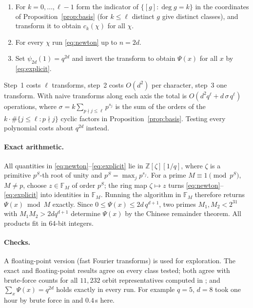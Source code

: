 \documentclass[11pt,a4paper]{article}
\theoremstyle{definition}
\theoremstyle{remark}
\begin{document}
\begin{enumerate}[label=\arabic*.,nosep]
\item For $k=0,\dots,\ell-1$ form the indicator of $\{[g]:\deg g=k\}$ in the coordinates of
      Proposition~\ref{prop:basis} (for $k\le\ell$ distinct $g$ give distinct classes), and transform
      it to obtain $c_k(\chi)$ for all $\chi$.
\item For every $\chi$ run \eqref{eq:newton} up to $n=2d$.
\item Set $\psi_{2d}(1)=q^{2d}$ and invert the transform to obtain $\Psi(x)$ for all $x$ by \eqref{eq:explicit}.
\end{enumerate}
Step~1 costs $\ell$ transforms, step~2 costs $O(d^2)$ per character, step~3 one transform. With
naive transforms along each axis the total is $O(d^2q^\ell+d\,\sigma\,q^\ell)$ operations, where
$\sigma=k\sum_{p\nmid j\le\ell}p^{s_j}$ is the sum of the orders of the $k\cdot\#\{j\le\ell:p\nmid j\}$ cyclic
factors in Proposition~\ref{prop:basis}. Testing every polynomial costs about $q^{2d}$ instead.

\paragraph{Exact arithmetic.}
All quantities in \eqref{eq:newton}--\eqref{eq:explicit} lie in $\mathbb Z[\zeta][1/q]$, where $\zeta$ is a
primitive $p^S$-th root of unity and $p^S=\max_jp^{s_j}$. For a prime $M\equiv1\pmod{p^S}$, $M\ne p$,
choose $z\in\mathbb F_M$ of order $p^S$; the ring map $\zeta\mapsto z$ turns
\eqref{eq:newton}--\eqref{eq:explicit} into identities in $\mathbb F_M$. Running the algorithm in $\mathbb F_M$
therefore returns $\Psi(x)\bmod M$ exactly. Since $0\le\Psi(x)\le 2d\,q^{d+1}$, two primes
$M_1,M_2<2^{31}$ with $M_1M_2>2dq^{d+1}$ determine $\Psi(x)$ by the Chinese remainder theorem.
All products fit in 64-bit integers.

\paragraph{Checks.} A floating-point version (fast Fourier transforms) is used for exploration.
The exact and floating-point results agree on every class tested; both agree with brute-force counts
for all $11{,}232$ orbit representatives computed in \cite{ChenV7}; and $\sum_x\Psi(x)=q^{2d}$ holds
exactly in every run. For example $q=5$, $d=8$ took one hour by brute force in \cite{ChenV7} and
$0.4$\,s here.

\end{document}
